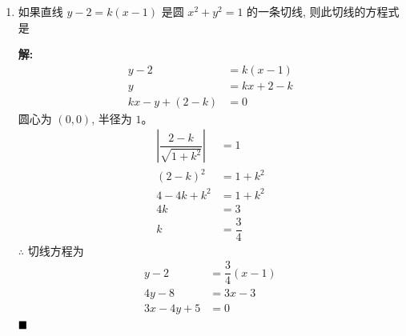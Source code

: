 \documentclass[10pt]{article}
\newcommand{\sol}{\textbf{解:} }
\begin{document}
\begin{enumerate}[leftmargin=*]
        \sol{}
        \begin{align*}
          (x+3)^{2}+(y-4)^{2}                 & = 25                                   \\
          x^{2} + 6x + 9 + y^{2} - 8y + 16    & = 25                                   \\
          x^{2} + y^{2} + 6x - 8y             & = 0                                    \\
          \text{切距}                           & = \sqrt{4^{2} + y^2 + 6 \times 4 - 8y} \\
                                              & = \sqrt{16 + y^2 + 24 - 8y}            \\
                                              & = \sqrt{40 + y^2 - 8y}                 \\
          \dfrac{d}{dy}(\sqrt{40 + y^2 - 8y}) & = 0                                    \\
          \dfrac{y - 4}{\sqrt{40 + y^2 - 8y}} & = 0                                    \\
          y                                   & = 4                                    \\
          \text{切距}                           & = \sqrt{40 + 4^2 - 8 \times 4}         \\
                                              & = \sqrt{40 + 16 - 32}                  \\
                                              & = \sqrt{24} = 2\sqrt{6}
        \end{align*}

  \item 如果直线 $y-2=k(x-1)$ 是圆 $x^{2}+y^{2}=1$ 的一条切线, 则此切线的方程式是

        \sol{}
        \begin{align*}
          y-2              & = k(x-1)     \\
          y                & = kx + 2 - k \\
          kx - y + (2 - k) & = 0
        \end{align*}
        圆心为 $(0, 0)$, 半径为 $1$。
        \begin{align*}
          \left\vert \dfrac{2-k}{\sqrt{1 + k^{2}}} \right\vert & = 1            \\
          (2-k)^{2}                                            & = 1 + k^{2}    \\
          4 - 4k + k^{2}                                       & = 1 + k^{2}    \\
          4k                                                   & = 3            \\
          k                                                    & = \dfrac{3}{4}
        \end{align*}
        $\therefore$ 切线方程为
        \begin{align*}
          y - 2       & = \dfrac{3}{4}(x-1) \\
          4y - 8      & = 3x - 3            \\
          3x - 4y + 5 & = 0
        \end{align*} $\hfill\blacksquare$


\end{enumerate}
\end{document}
